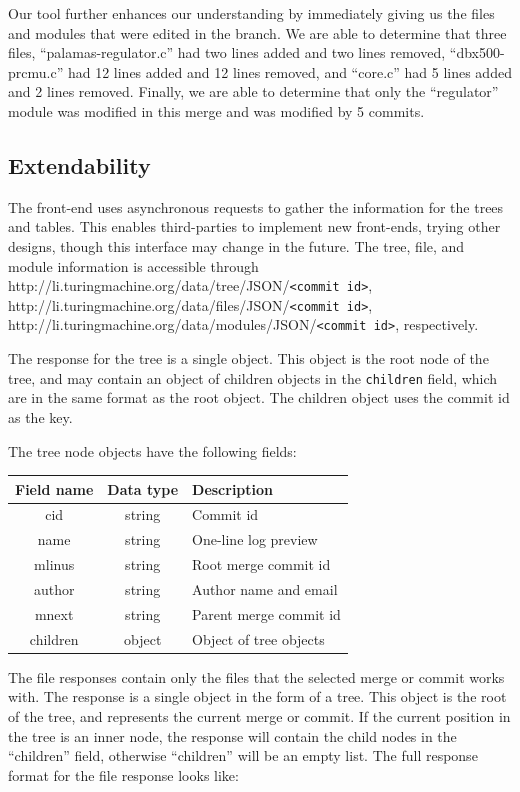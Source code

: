 \documentclass[conference, draftclsnofoot]{IEEEtran}
\begin{document}
Our tool further enhances our understanding by immediately giving us the files
and modules that were edited in the branch. We are able to determine that three
files, ``palamas-regulator.c'' had two lines added and two lines removed,
``dbx500-prcmu.c'' had 12 lines added and 12 lines removed, and ``core.c'' had 5
lines added and 2 lines removed. Finally, we are able to determine that only the
``regulator'' module was modified in this merge and was modified by 5 commits.

\subsection{Extendability}

The front-end uses asynchronous requests to gather the information for the trees and
tables. This enables third-parties to implement new front-ends, trying other
designs, though this interface may change in the future. The tree, file, and module
information is accessible through 
http://li.turingmachine.org/data/tree/JSON/\verb|<commit id>|,
http://li.turingmachine.org/data/files/JSON/\verb|<commit id>|,
http://li.turingmachine.org/data/modules/JSON/\verb|<commit id>|, respectively.

The response for the tree is a single object. This object is the root node of the
tree, and may contain an object of children objects in the \verb|children| field,
which are in the same format as the root object. The children object uses the commit
id as the key.

The tree node objects have the following fields:

\begin{tabular}{ccl}
        Field name & Data type & Description\\\hline
        cid & string & Commit id\\
        name & string & One-line log preview\\
        mlinus & string & Root merge commit id\\
        author & string & Author name and email\\
        mnext & string & Parent merge commit id\\
        children & object & Object of tree objects\\
\end{tabular}

The file responses contain only the files that the selected merge or commit works
with. The response is a single object in the form of a tree. This object is the root
of the tree, and represents the current merge or commit. If the current position in
the tree is an inner node, the response will contain the child nodes in the
``children'' field, otherwise ``children'' will be an empty list. The full response
format for the file response looks like:
\end{document}
